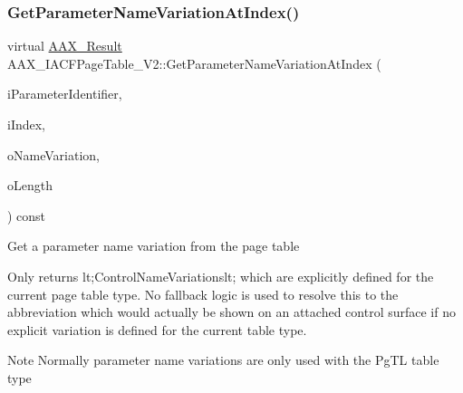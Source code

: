 \subsubsection{\texorpdfstring{GetParameterNameVariationAtIndex()}{GetParameterNameVariationAtIndex()}}
{\footnotesize\ttfamily virtual \mbox{\hyperlink{a00392_a4d8f69a697df7f70c3a8e9b8ee130d2f}{A\+A\+X\+\_\+\+Result}} A\+A\+X\+\_\+\+I\+A\+C\+F\+Page\+Table\+\_\+\+V2\+::\+Get\+Parameter\+Name\+Variation\+At\+Index (\begin{DoxyParamCaption}\item[{\mbox{\hyperlink{a00392_ab4e01b971dac1b25632fd9f710dd8f77}{A\+A\+X\+\_\+\+C\+Page\+Table\+Param\+ID}}}]{i\+Parameter\+Identifier,  }\item[{int32\+\_\+t}]{i\+Index,  }\item[{\mbox{\hyperlink{a01873}{A\+A\+X\+\_\+\+I\+String}} \&}]{o\+Name\+Variation,  }\item[{int32\+\_\+t \&}]{o\+Length }\end{DoxyParamCaption}) const\hspace{0.3cm}{\ttfamily [pure virtual]}}





Get a parameter name variation from the page table

Only returns {\ttfamily lt;Control\+Name\+Variationslt;} which are explicitly defined for the current page table type. No fallback logic is used to resolve this to the abbreviation which would actually be shown on an attached control surface if no explicit variation is defined for the current table type.

\begin{DoxyNote}{Note}
Normally parameter name variations are only used with the {\ttfamily \textquotesingle{}Pg\+TL\textquotesingle{}} table type
\end{DoxyNote}

